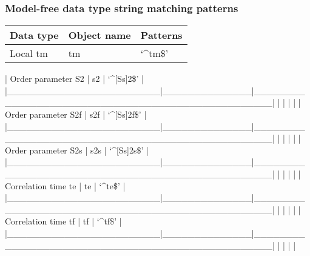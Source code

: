 \subsubsection{Model-free data type string matching patterns}



\begin{center}
\begin{tabular}{lll}
\toprule
Data type & Object name & Patterns \\
\midrule
 Local tm                &  tm            &  `\^{}tm\$'                                            \\
\bottomrule
\end{tabular}
\end{center}

| Order parameter S2     | s2           | `\^{}[Ss]2\$'                                        |
|\_\_\_\_\_\_\_\_\_\_\_\_\_\_\_\_\_\_\_\_\_\_\_\_|\_\_\_\_\_\_\_\_\_\_\_\_\_\_|\_\_\_\_\_\_\_\_\_\_\_\_\_\_\_\_\_\_\_\_\_\_\_\_\_\_\_\_\_\_\_\_\_\_\_\_\_\_\_\_\_\_\_\_\_\_\_\_\_\_|
|                        |              |                                                  |
| Order parameter S2f    | s2f          | `\^{}[Ss]2f\$'                                       |
|\_\_\_\_\_\_\_\_\_\_\_\_\_\_\_\_\_\_\_\_\_\_\_\_|\_\_\_\_\_\_\_\_\_\_\_\_\_\_|\_\_\_\_\_\_\_\_\_\_\_\_\_\_\_\_\_\_\_\_\_\_\_\_\_\_\_\_\_\_\_\_\_\_\_\_\_\_\_\_\_\_\_\_\_\_\_\_\_\_|
|                        |              |                                                  |
| Order parameter S2s    | s2s          | `\^{}[Ss]2s\$'                                       |
|\_\_\_\_\_\_\_\_\_\_\_\_\_\_\_\_\_\_\_\_\_\_\_\_|\_\_\_\_\_\_\_\_\_\_\_\_\_\_|\_\_\_\_\_\_\_\_\_\_\_\_\_\_\_\_\_\_\_\_\_\_\_\_\_\_\_\_\_\_\_\_\_\_\_\_\_\_\_\_\_\_\_\_\_\_\_\_\_\_|
|                        |              |                                                  |
| Correlation time te    | te           | `\^{}te\$'                                           |
|\_\_\_\_\_\_\_\_\_\_\_\_\_\_\_\_\_\_\_\_\_\_\_\_|\_\_\_\_\_\_\_\_\_\_\_\_\_\_|\_\_\_\_\_\_\_\_\_\_\_\_\_\_\_\_\_\_\_\_\_\_\_\_\_\_\_\_\_\_\_\_\_\_\_\_\_\_\_\_\_\_\_\_\_\_\_\_\_\_|
|                        |              |                                                  |
| Correlation time tf    | tf           | `\^{}tf\$'                                           |
|\_\_\_\_\_\_\_\_\_\_\_\_\_\_\_\_\_\_\_\_\_\_\_\_|\_\_\_\_\_\_\_\_\_\_\_\_\_\_|\_\_\_\_\_\_\_\_\_\_\_\_\_\_\_\_\_\_\_\_\_\_\_\_\_\_\_\_\_\_\_\_\_\_\_\_\_\_\_\_\_\_\_\_\_\_\_\_\_\_|
|                        |              |                                                  |
